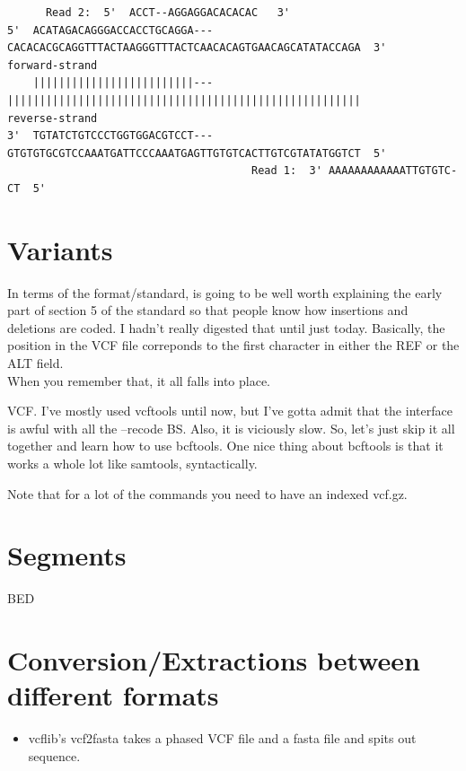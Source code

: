 \documentclass[]{krantz}
\providecommand{\tightlist}{%
  \setlength{\itemsep}{0pt}\setlength{\parskip}{0pt}}
\begin{document}
\begin{verbatim}
      Read 2:  5'  ACCT--AGGAGGACACACAC   3' 
5'  ACATAGACAGGGACCACCTGCAGGA---CACACACGCAGGTTTACTAAGGGTTTACTCAACACAGTGAACAGCATATACCAGA  3'  
forward-strand
    |||||||||||||||||||||||||---|||||||||||||||||||||||||||||||||||||||||||||||||||||||
reverse-strand
3'  TGTATCTGTCCCTGGTGGACGTCCT---GTGTGTGCGTCCAAATGATTCCCAAATGAGTTGTGTCACTTGTCGTATATGGTCT  5'
                                      Read 1:  3' AAAAAAAAAAAATTGTGTC-CT  5'
\end{verbatim}

\hypertarget{variants}{%
\section{Variants}\label{variants}}

In terms of the format/standard, is going to be well worth explaining the early
part of section 5 of the standard so that people know how insertions and deletions
are coded. I hadn't really digested that until just today. Basically, the position
in the VCF file correponds to the first character in either the REF or the ALT field.\\
When you remember that, it all falls into place.

VCF. I've mostly used vcftools until now, but I've gotta admit that the interface
is awful with all the --recode BS. Also, it is viciously slow. So, let's just
skip it all together and learn how to use bcftools. One nice thing about
bcftools is that it works a whole lot like samtools, syntactically.

Note that for a lot of the commands you need to have an indexed vcf.gz.

\hypertarget{segments}{%
\section{Segments}\label{segments}}

BED

\hypertarget{conversionextractions-between-different-formats}{%
\section{Conversion/Extractions between different formats}\label{conversionextractions-between-different-formats}}

\begin{itemize}
\tightlist
\item
  vcflib's vcf2fasta takes a phased VCF file and a fasta file and spits out sequence.
\end{itemize}
\end{document}
